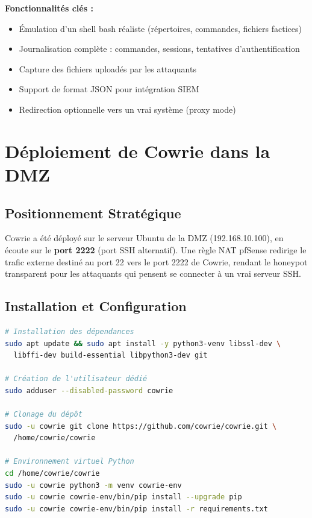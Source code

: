 \documentclass[12pt,a4paper,openany]{report}
\begin{document}
\textbf{Fonctionnalités clés :}
\begin{itemize}
    \item Émulation d'un shell bash réaliste (répertoires, commandes, fichiers factices)
    \item Journalisation complète : commandes, sessions, tentatives d'authentification
    \item Capture des fichiers uploadés par les attaquants
    \item Support de format JSON pour intégration SIEM
    \item Redirection optionnelle vers un vrai système (proxy mode)
\end{itemize}

\section{Déploiement de Cowrie dans la DMZ}

\subsection{Positionnement Stratégique}

Cowrie a été déployé sur le serveur Ubuntu de la DMZ (192.168.10.100), en écoute sur le
\textbf{port 2222} (port SSH alternatif). Une règle NAT pfSense redirige le trafic externe
destiné au port 22 vers le port 2222 de Cowrie, rendant le honeypot transparent pour les
attaquants qui pensent se connecter à un vrai serveur SSH.

\subsection{Installation et Configuration}

\begin{lstlisting}[language=bash, caption={Installation de Cowrie sur Ubuntu (DMZ)}]
# Installation des dépendances
sudo apt update && sudo apt install -y python3-venv libssl-dev \
  libffi-dev build-essential libpython3-dev git

# Création de l'utilisateur dédié
sudo adduser --disabled-password cowrie

# Clonage du dépôt
sudo -u cowrie git clone https://github.com/cowrie/cowrie.git \
  /home/cowrie/cowrie

# Environnement virtuel Python
cd /home/cowrie/cowrie
sudo -u cowrie python3 -m venv cowrie-env
sudo -u cowrie cowrie-env/bin/pip install --upgrade pip
sudo -u cowrie cowrie-env/bin/pip install -r requirements.txt
\end{lstlisting}
\end{document}
